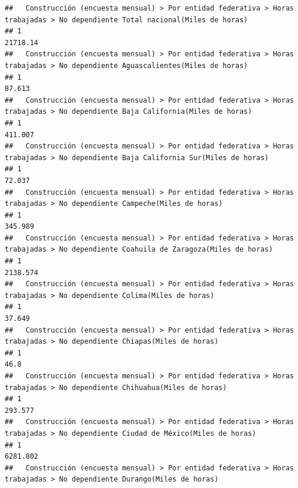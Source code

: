 \documentclass[
]{article}
\begin{document}
\begin{verbatim}
##   Construcción (encuesta mensual) > Por entidad federativa > Horas trabajadas > No dependiente Total nacional(Miles de horas) 
## 1                                                                                                                     21718.14
##   Construcción (encuesta mensual) > Por entidad federativa > Horas trabajadas > No dependiente Aguascalientes(Miles de horas) 
## 1                                                                                                                       87.613
##   Construcción (encuesta mensual) > Por entidad federativa > Horas trabajadas > No dependiente Baja California(Miles de horas) 
## 1                                                                                                                       411.007
##   Construcción (encuesta mensual) > Por entidad federativa > Horas trabajadas > No dependiente Baja California Sur(Miles de horas) 
## 1                                                                                                                            72.037
##   Construcción (encuesta mensual) > Por entidad federativa > Horas trabajadas > No dependiente Campeche(Miles de horas) 
## 1                                                                                                                345.989
##   Construcción (encuesta mensual) > Por entidad federativa > Horas trabajadas > No dependiente Coahuila de Zaragoza(Miles de horas) 
## 1                                                                                                                           2138.574
##   Construcción (encuesta mensual) > Por entidad federativa > Horas trabajadas > No dependiente Colima(Miles de horas) 
## 1                                                                                                               37.649
##   Construcción (encuesta mensual) > Por entidad federativa > Horas trabajadas > No dependiente Chiapas(Miles de horas) 
## 1                                                                                                                  46.8
##   Construcción (encuesta mensual) > Por entidad federativa > Horas trabajadas > No dependiente Chihuahua(Miles de horas) 
## 1                                                                                                                 293.577
##   Construcción (encuesta mensual) > Por entidad federativa > Horas trabajadas > No dependiente Ciudad de México(Miles de horas) 
## 1                                                                                                                       6281.802
##   Construcción (encuesta mensual) > Por entidad federativa > Horas trabajadas > No dependiente Durango(Miles de horas) 

\end{verbatim}
\end{document}

